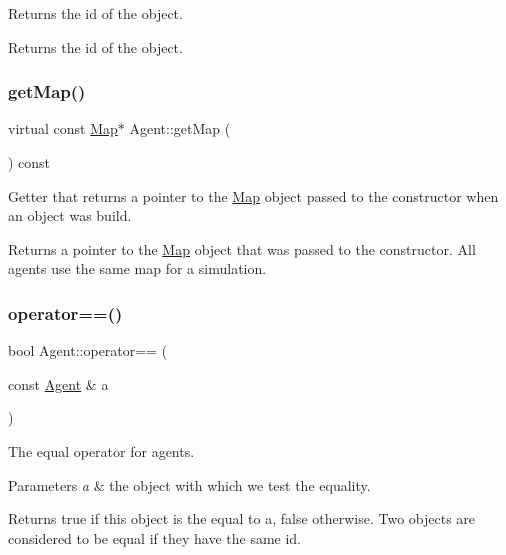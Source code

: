 Returns the id of the object. \begin{DoxyReturn}{Returns}
the id of the object. 
\end{DoxyReturn}
\mbox{\label{class_agent_a3b60b2f0a0f41ce1f14c39a33cffcc4d}} 
\subsubsection{\texorpdfstring{get\+Map()}{getMap()}}
{\footnotesize\ttfamily virtual const \hyperlink{class_map}{Map}$\ast$ Agent\+::get\+Map (\begin{DoxyParamCaption}{ }\end{DoxyParamCaption}) const\hspace{0.3cm}{\ttfamily [virtual]}}

Getter that returns a pointer to the \hyperlink{class_map}{Map} object passed to the constructor when an object was build. \begin{DoxyReturn}{Returns}
a pointer to the \hyperlink{class_map}{Map} object that was passed to the constructor. All agents use the same map for a simulation. 
\end{DoxyReturn}
\mbox{\label{class_agent_afa2b3a408bb0694aea46fb2bb59bacf7}} 
\subsubsection{\texorpdfstring{operator==()}{operator==()}}
{\footnotesize\ttfamily bool Agent\+::operator== (\begin{DoxyParamCaption}\item[{const \hyperlink{class_agent}{Agent} \&}]{a }\end{DoxyParamCaption})}

The equal operator for agents. 
\begin{DoxyParams}{Parameters}
{\em a} & the object with which we test the equality. \\
\hline
\end{DoxyParams}
\begin{DoxyReturn}{Returns}
true if this object is the equal to a, false otherwise. Two objects are considered to be equal if they have the same id. 
\end{DoxyReturn}
\mbox{\label{class_agent_a44f291596d10c7878b0641d6ec156328}} 
